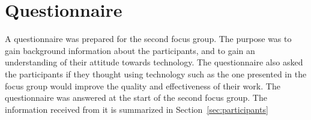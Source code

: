 \section{Questionnaire}
A questionnaire was prepared for the second focus group. The purpose was to gain background information about the participants, and to gain an understanding of their attitude towards technology. The questionnaire also asked the participants if they thought using technology such as the one presented in the focus group would improve the quality and effectiveness of their work. The questionnaire was answered at the start of the second focus group. The information received from it is summarized in Section~\ref{sec:participants}
